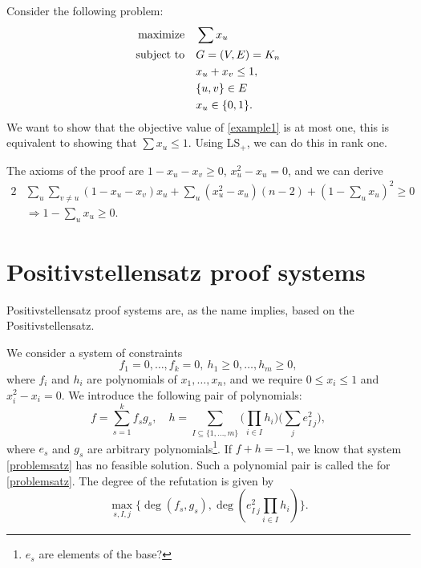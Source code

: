 \documentclass[a4paper,twoside,justified]{tufte-handout}
\begin{document}
\begin{example}
Consider the following problem:
\begin{alignat}{2}
\label{example1}
  \text{maximize}\hspace{1em}& \sum x_u\notag \\
  \text{subject to}\hspace{1em}& G=(V,E)=K_n\notag \\
  & x_u+x_v\leq 1,\notag \\
&\{u,v\}\in E\notag\\
&x_u\in\{0,1\}.
\end{alignat}
We want to show that the objective value of \eqref{example1} is at most one, this is equivalent to showing that $\sum x_u\leq 1$. Using LS$_+$, we can do this in rank one.

The axioms of the proof are $1-x_u-x_v\geq 0$, $x_u^2-x_u=0$, and we can derive
\begin{alignat*}{2}
&\sum_u\sum_{v\neq u}(1-x_u-x_v)x_u+\sum_u(x_u^2-x_u)(n-2)+(1-\sum_ux_u)^2\geq0\\
&\Rightarrow1-\sum_ux_u\geq0.
\end{alignat*}
\end{example}

\section{Positivstellensatz proof systems\cite{grigoriev2001complexity}}
Positivstellensatz proof systems are, as the name implies, based on the Positivstellensatz\cite{bochnak1987satz}. 

We consider a system of constraints
\begin{equation}
\label{problemsatz}
f_1=0,\ldots,f_k=0,\ h_1\geq0,\ldots,h_m\geq0,
\end{equation}
where $f_i$ and $h_i$ are polynomials of $x_1,\ldots,x_n$, and we require $0\leq x_i \leq 1$ and $x_i^2-x_i=0$. We introduce the following pair of polynomials:
\begin{equation}
\label{polpair}
f = \sum_{s=1}^kf_sg_s,\quad h = \sum_{I\subseteq\{1,\ldots,m\}}\big(\prod_{i\in I}h_i\big)\big(\sum_je^2_{I\ j}\big),
\end{equation}
where $e_s$ and $g_s$ are arbitrary polynomials\footnote{$e_s$ are elements of the base?}. If $f+h=-1$, we know that system \eqref{problemsatz} has no feasible solution. Such a polynomial pair is called the  for \eqref{problemsatz}. The degree of the refutation is given by
\begin{equation}
\label{degreesatz}
\max_{s,I,j}\{\deg(f_s,g_s),\deg(e^2_{I\ j}\prod_{i\in I}h_i)\}.
\end{equation} 
\end{document}

